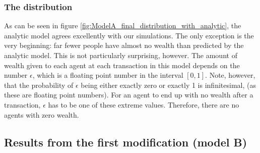 \documentclass[a4paper, 10pt]{article}
\begin{document}
\subsubsection{The distribution}
As can be seen in figure \ref{fig:ModelA_final_distribution_with_analytic}, the analytic model agrees excellently with our simulations. The only exception is the very beginning: far fewer people have almost no wealth than predicted by the analytic model. This is not particularly surprising, however. The amount of wealth given to each agent at each transaction in this model depends on the number $\epsilon$, which is a floating point number in the interval $[0,1]$. Note, however, that the probability of $\epsilon$ being either exactly zero or exactly 1 is infinitesimal,  %
(as these are floating point numbers). For an agent to end up with no wealth after a transaction, $\epsilon$ has to be one of these extreme values. Therefore, there are no agents with zero wealth. %


\subsection{Results from the first modification (model B)}
\end{document}
